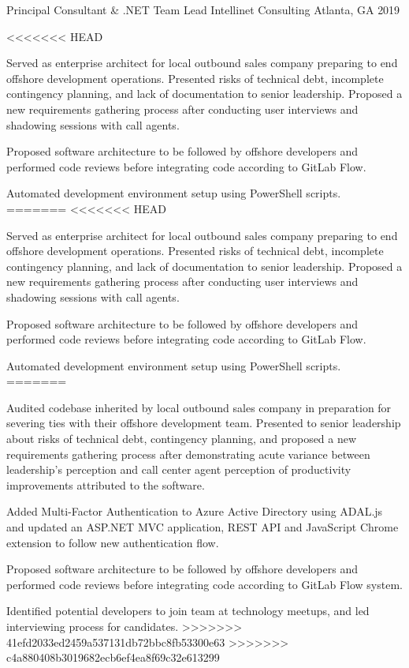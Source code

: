 \begin{cventries}
  \cventry
    {Principal Consultant \& .NET Team Lead} %
    {Intellinet Consulting} %
    {Atlanta, GA} %
    {2019} %
    {
      \begin{cvitems} %
<<<<<<< HEAD
        \item {Served as enterprise architect for local outbound sales company preparing to end offshore development operations. Presented risks of technical debt, incomplete contingency planning, and lack of documentation to senior leadership. Proposed a new requirements gathering process after conducting user interviews and shadowing sessions with call agents.}
        \item {Proposed software architecture to be followed by offshore developers and performed code reviews before integrating code according to GitLab Flow.}
        \item {Automated development environment setup using PowerShell scripts.}
=======
<<<<<<< HEAD
        \item {Served as enterprise architect for local outbound sales company preparing to end offshore development operations. Presented risks of technical debt, incomplete contingency planning, and lack of documentation to senior leadership. Proposed a new requirements gathering process after conducting user interviews and shadowing sessions with call agents.}
        \item {Proposed software architecture to be followed by offshore developers and performed code reviews before integrating code according to GitLab Flow.}
        \item {Automated development environment setup using PowerShell scripts.}
=======
        \item {Audited codebase inherited by local outbound sales company in preparation for severing ties with their offshore development team. Presented to senior leadership about risks of technical debt, contingency planning, and proposed a new requirements gathering process after demonstrating acute variance between leadership’s perception and call center agent perception of productivity improvements attributed to the software.}
        \item {Added Multi-Factor Authentication to Azure Active Directory using ADAL.js and updated an ASP.NET MVC application, REST API and JavaScript Chrome extension to follow new authentication flow.}
        \item {Proposed software architecture to be followed by offshore developers and performed code reviews before integrating code according to GitLab Flow system.}
        \item {Identified potential developers to join team at technology meetups, and led interviewing process for candidates.}
>>>>>>> 41efd2033ed2459a537131db72bbc8fb53300e63
>>>>>>> c4a880408b3019682ecb6ef4ea8f69c32e613299
      \end{cvitems}
    }


\end{cventries}
